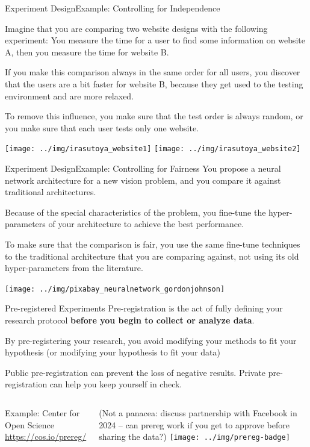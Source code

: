 \begin{frame}{Experiment Design}{Example: Controlling for Independence}
  {\smaller
  Imagine that you are comparing two website designs with the following experiment: You measure the time for a user to find some information on website A, then you measure the time for website B. \bigskip

  If you make this comparison always in the same order for all users, you discover that the users are a bit faster for website B, because they get used to the testing environment and are more relaxed. \bigskip

  To remove this influence, you make sure that the test order is always random, or you make sure that each user tests only one website.}

  \begin{center}
    \texttt{[image: ../img/irasutoya\_website1]}\hspace{1cm}
    \texttt{[image: ../img/irasutoya\_website2]}
  \end{center}
\end{frame}

\begin{frame}{Experiment Design}{Example: Controlling for Fairness}
  You propose a neural network architecture for a new vision problem, and you compare it against traditional architectures.\bigskip

  Because of the special characteristics of the problem, you fine-tune the hyper-parameters of your architecture to achieve the best performance.\bigskip

  To make sure that the comparison is fair, you use the same fine-tune techniques to the traditional architecture that you are comparing against, not using its old hyper-parameters from the literature.

  \hfill\texttt{[image: ../img/pixabay\_neuralnetwork\_gordonjohnson]}
\end{frame}

\begin{frame}{Pre-registered Experiments}
  Pre-registration is the act of fully defining your research protocol {\bf before you begin to collect or analyze data}.
  \bigskip

  By pre-registering your research, you avoid modifying your methods to fit your hypothesis (or modifying your hypothesis to fit your data)
  \bigskip

  Public pre-registration can prevent the loss of negative results. Private pre-registration can help you keep yourself in check.\bigskip

  \begin{columns}
    Example: Center for Open Science \url{https://cos.io/prereg/}
    \medskip

    \alert{(Not a panacea: discuss partnership with Facebook in 2024 -- can prereg work if you get to approve before sharing the data?)}
    \texttt{[image: ../img/prereg-badge]}
  \end{columns}
\end{frame}


